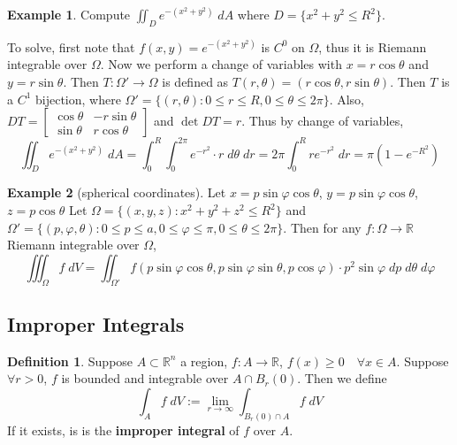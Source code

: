 \documentclass[11pt]{article}
\theoremstyle{definition}
\newtheorem{exmp}{Example}[section]
\theoremstyle{definition}
\newcommand{\R}[0]{\mathbb{R}}
\theoremstyle{definition}
\newtheorem{definition}{\textcolor{OliveGreen}{Definition}}
\theoremstyle{remark}
\begin{document}
\begin{exmp}
    Compute $\iint_D e^{-(x^2 + y^2)} \; dA$ where $D = \{x^2 + y^2 \leq R^2\}$.
    
    To solve, first note that $f(x,y) = e^{-(x^2 + y^2)}$ is $C^0$ on $\Omega$, thus it is Riemann integrable over $\Omega$.
    Now we perform a change of variables with $x = r \cos \theta$ and $y = r \sin \theta$. Then $T : \Omega' \to \Omega$ is defined as
    $T(r, \theta) = (r \cos \theta, r \sin \theta)$. Then $T$ is a $C^1$ bijection, where $\Omega' = \{(r, \theta) : 0 \leq r \leq R, 0 \leq \theta \leq 2\pi\}$.
    Also, $DT = \begin{bmatrix}
        \cos \theta & -r \sin \theta \\
        \sin \theta & r \cos \theta
    \end{bmatrix} $ and $\det DT = r$. Thus by change of variables,
    \[
        \iint_{D} e^{-(x^2 + y^2)} \; dA = \int_{0}^{R} \int_{0}^{2\pi} e^{-r^2} \cdot r \; d\theta \; dr = 2\pi \int_0^R r e^{-r^2} \; dr = \pi (1 - e^{-R^2})
    \]    
\end{exmp}

\begin{exmp}[spherical coordinates]
    Let $x = p \sin \varphi \cos \theta$, $y = p \sin \varphi \cos \theta$, $z = p \cos \theta$
    Let $\Omega = \{(x, y, z) : x^2 + y^2 + z^2 \leq R^2\}$ and $\Omega' = \{(p, \varphi, \theta) : 0 \leq p \leq a, 0 \leq \varphi \leq \pi, 0 \leq \theta \leq 2 \pi\}$.
    Then for any $f : \Omega \to \R$ Riemann integrable over $\Omega$,
    \[
        \iiint_{\Omega} f \; dV = \iint_{\Omega'} f(p \sin \varphi \cos \theta, p \sin \varphi \sin \theta, p \cos \varphi) \cdot p^2 \sin \varphi \; dp \; d\theta \; d\varphi
    \] 
\end{exmp}

\subsection{Improper Integrals}


\begin{definition}
    Suppose $A \subset \R^n$ a region, $f : A \to \R$, $f(x) \geq 0 \quad \forall x \in A$.
    Suppose $\forall r > 0$, $f$ is bounded and integrable over $A \cap B_r(0)$. Then we define
    \[
        \int_{A} f \; dV := \lim_{r \to \infty} \int_{B_r(0) \cap A} f \; dV
    \]      
    If it exists, is is the \textbf{improper integral} of $f$ over $A$.
\end{definition}
\end{document}

